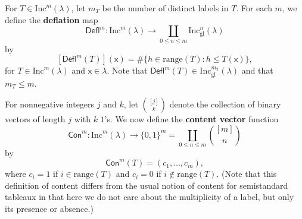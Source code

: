 \documentclass[12pt]{amsart}
\newcommand{\x}{\ensuremath{\mathsf{x}}}
\theoremstyle{definition}
\theoremstyle{remark}
\numberwithin{equation}{section}
\newcommand{\inc}{\ensuremath{\mathrm{Inc}}}
\newcommand{\incgl}{\inc_{\mathrm{gl}}}
\newcommand{\deflate}{\ensuremath{\mathsf{Defl}}}
\newcommand{\content}{\ensuremath{\mathsf{Con}}}
\begin{document}
For $T \in \inc^m(\lambda)$, let $m_T$ be the number of distinct labels in $T$. For each $m$, we define the {\bf deflation} map \[\deflate^m : \inc^m(\lambda) \to \coprod_{0 \leq n \leq m} \incgl^n(\lambda)\] by
\[
[\deflate^m(T)](\x) =
\# \{ h \in \mathrm{range}(T): h \leq T(\x) \} ,
\]
for $T \in \inc^m(\lambda)$ and $\x \in \lambda$. Note that $\deflate^m(T) \in \incgl^{m_T}(\lambda)$ and that $m_T \leq m$.

For nonnegative integers $j$ and $k$, let $\binom{[j]}{k}$ denote the collection of binary vectors of length $j$ with $k$ $1$'s. We now define the {\bf content vector} function 
\[
 \content^m : \inc^m(\lambda) \to \{ 0, 1\}^m = \coprod_{0 \leq  n \leq m} \binom{[m]}{n}
 \] 
 by 
\[
\content^m(T) = (c_1, \dots, c_m),
\] 
where $c_i = 1$ if $i \in \mathrm{range}(T)$ and $c_i = 0$ if $i \notin \mathrm{range}(T)$. (Note that this definition of content differs from the usual notion of content for semistandard tableaux in that here we do not care about the multiplicity of a label, but only its presence or absence.)
\end{document}
